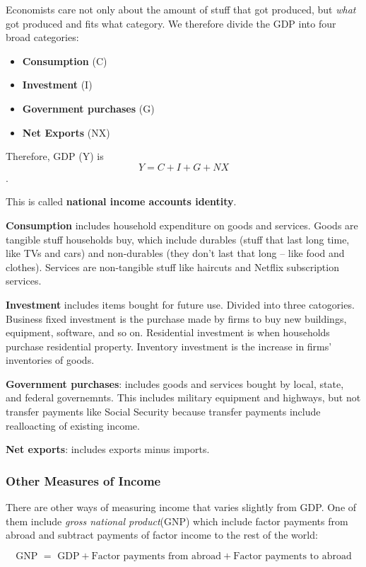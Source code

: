 \documentclass[12pt]{article}
\begin{document}
Economists care not only about the amount of stuff that got produced, but \textit{what} got produced and fits what category. We therefore divide the GDP into four broad categories:

\begin{itemize}
    \item \textbf{Consumption} (C)
    \item \textbf{Investment} (I)
    \item \textbf{Government purchases} (G)
    \item \textbf{Net Exports} (NX)
\end{itemize}

Therefore, GDP (Y) is $$Y = C + I + G + NX$$.

This is called \textbf{national income accounts identity}.

\textbf{Consumption} includes household expenditure on goods and services. Goods are tangible stuff households buy, which include durables (stuff that last long time, like TVs and cars) and non-durables (they don't last that long -- like food and clothes). Services are non-tangible stuff like haircuts and Netflix subscription services.

\textbf{Investment} includes items bought for future use. Divided into three catogories. Business fixed investment is the purchase made by firms to buy new buildings, equipment, software, and so on. Residential investment is when households purchase residential property. Inventory investment is the increase in firms' inventories of goods.

\textbf{Government purchases}: includes goods and services bought by local, state, and federal governemnts. This includes military equipment and highways, but not transfer payments like Social Security because transfer payments include realloacting of existing income.

\textbf{Net exports}: includes exports minus imports.


\subsubsection{Other Measures of Income}

There are other ways of measuring income that varies slightly from GDP. One of them include \textit{gross national product}(GNP) which include factor payments from abroad and subtract payments of factor income to the rest of the world:

$$\text{GNP } = \text{ GDP} + \text{Factor payments from abroad} + \text{Factor payments to abroad}$$
\end{document}

